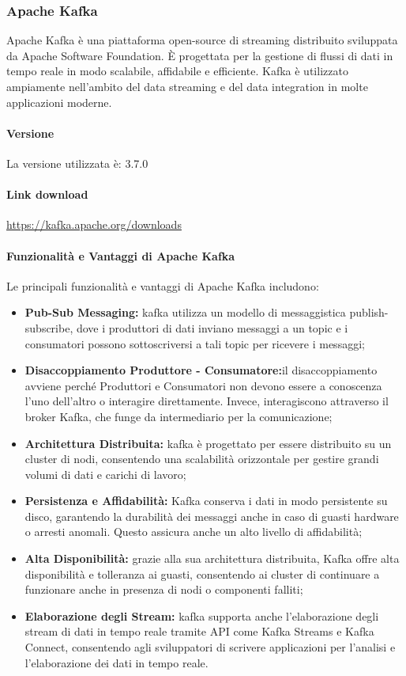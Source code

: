 \subsubsection{Apache Kafka}

Apache Kafka è una piattaforma open-source di streaming distribuito sviluppata da Apache Software Foundation. È progettata per la gestione di flussi di dati in tempo reale in modo scalabile, affidabile e efficiente. Kafka è utilizzato ampiamente nell'ambito del data streaming e del data integration in molte applicazioni moderne.
\paragraph{Versione}
La versione utilizzata è: 3.7.0
\paragraph{Link download}
\href{https://kafka.apache.org/downloads}{https://kafka.apache.org/downloads}

\paragraph{Funzionalità e Vantaggi di Apache Kafka}
Le principali funzionalità e vantaggi di Apache Kafka includono:

\begin{itemize}
  \item \textbf{Pub-Sub Messaging:} kafka utilizza un modello di messaggistica publish-subscribe, dove i produttori di dati inviano messaggi a un topic e i consumatori possono sottoscriversi a tali topic per ricevere i messaggi;
  \item \textbf{Disaccoppiamento Produttore - Consumatore:}il disaccoppiamento avviene perché Produttori e Consumatori non devono essere a conoscenza l'uno dell'altro o interagire direttamente. Invece, interagiscono attraverso il broker Kafka, che funge da intermediario per la comunicazione;
  \item \textbf{Architettura Distribuita:} kafka è progettato per essere distribuito su un cluster di nodi, consentendo una scalabilità orizzontale per gestire grandi volumi di dati e carichi di lavoro;
  
  \item \textbf{Persistenza e Affidabilità:} Kafka conserva i dati in modo persistente su disco, garantendo la durabilità dei messaggi anche in caso di guasti hardware o arresti anomali. Questo assicura anche un alto livello di affidabilità;
  
  \item \textbf{Alta Disponibilità:} grazie alla sua architettura distribuita, Kafka offre alta disponibilità e tolleranza ai guasti, consentendo ai cluster di continuare a funzionare anche in presenza di nodi o componenti falliti;
  
  \item \textbf{Elaborazione degli Stream:} kafka supporta anche l'elaborazione degli stream di dati in tempo reale tramite API come Kafka Streams e Kafka Connect, consentendo agli sviluppatori di scrivere applicazioni per l'analisi e l'elaborazione dei dati in tempo reale.
\end{itemize}

